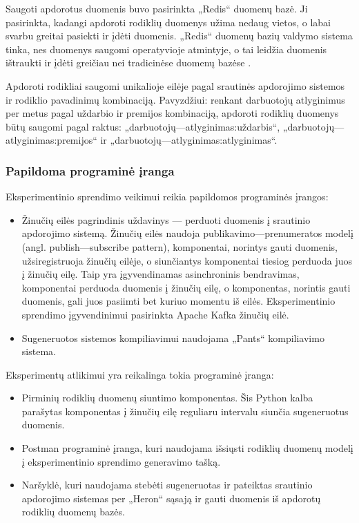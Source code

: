 \documentclass{VUMIFPSbakalaurinis}
\begin{document}
Saugoti apdorotus duomenis buvo pasirinkta „Redis“ duomenų bazė. Ji pasirinkta, kadangi apdoroti rodiklių duomenys užima nedaug vietos, o labai svarbu greitai pasiekti ir įdėti duomenis. „Redis“ duomenų bazių valdymo sistema tinka, nes duomenys saugomi operatyvioje atmintyje, o tai leidžia duomenis ištraukti ir įdėti greičiau nei tradicinėse duomenų bazėse \cite{carlson2013redis}.\par
Apdoroti rodikliai saugomi unikalioje eilėje pagal srautinės apdorojimo sistemos ir rodiklio pavadinimų kombinaciją. Pavyzdžiui: renkant darbuotojų atlyginimus per metus pagal uždarbio ir premijos kombinaciją, apdoroti rodiklių duomenys būtų saugomi pagal raktus: „darbuotojų—atlyginimas:uždarbis“, „darbuotojų—atlyginimas:premijos“ ir „darbuotojų—atlyginimas:atlyginimas“.

\subsubsection{Papildoma programinė įranga}

Eksperimentinio sprendimo veikimui reikia papildomos programinės įrangos:
\begin{itemize}
    \item Žinučių eilės pagrindinis uždavinys — perduoti duomenis į srautinio apdorojimo sistemą. Žinučių eilės naudoja publikavimo—prenumeratos modelį (angl. publish—subscribe pattern), komponentai, norintys gauti duomenis, užsiregistruoja žinučių eilėje, o siunčiantys komponentai tiesiog perduoda juos į žinučių eilę. Taip yra įgyvendinamas asinchroninis bendravimas, komponentai perduoda duomenis į žinučių eilę, o komponentas, norintis gauti duomenis, gali juos pasiimti bet kuriuo momentu iš eilės. Eksperimentinio sprendimo įgyvendinimui pasirinkta Apache Kafka žinučių eilė.
    \item Sugeneruotos sistemos kompiliavimui naudojama „Pants“ kompiliavimo sistema.
\end{itemize}
Eksperimentų atlikimui yra reikalinga tokia programinė įranga:
\begin{itemize}
    \item Pirminių rodiklių duomenų siuntimo komponentas. Šis Python kalba parašytas komponentas į žinučių eilę reguliaru intervalu siunčia sugeneruotus duomenis.
    \item Postman programinė įranga, kuri naudojama išsiųsti rodiklių duomenų modelį į eksperimentinio sprendimo generavimo tašką.
    \item Naršyklė, kuri naudojama stebėti sugeneruotas ir pateiktas srautinio apdorojimo sistemas per „Heron“ sąsają ir gauti duomenis iš apdorotų rodiklių duomenų bazės.
\end{itemize}
\end{document}
